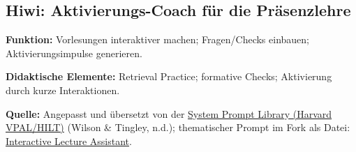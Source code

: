 \documentclass[
  ngerman,
  letterpaper,
  DIV=11]{scrreprt}
\begin{document}
\subsection{Hiwi: Aktivierungs-Coach für die
Präsenzlehre}\label{sec-prompt-aktivierungs-coach}

\textbf{Funktion:} Vorlesungen interaktiver machen; Fragen/Checks
einbauen; Aktivierungsimpulse generieren.

\textbf{Didaktische Elemente:} Retrieval Practice; formative Checks;
Aktivierung durch kurze Interaktionen.

\textbf{Quelle:} Angepasst und übersetzt von der
\href{https://github.com/ncwilson78/System-Prompt-Library}{System Prompt
Library (Harvard VPAL/HILT)} (Wilson \& Tingley, n.d.); thematischer
Prompt im Fork als Datei:
\href{https://github.com/motazsaad/Harvard-System-Prompt-Library/blob/main/Prompts/Teaching\%20Activities/Interactive\%20Lecture\%20Assistant\%20GPT.md}{Interactive
Lecture Assistant}.
\end{document}
